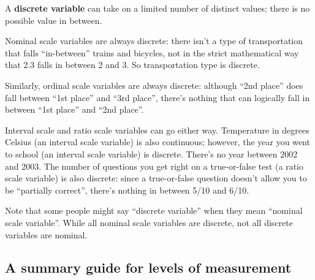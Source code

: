 \documentclass[
  11pt,
  a4paper,
  twoside,symmetric,openright]{book}
\theoremstyle{break}
\theoremstyle{break}
\begin{document}
\begin{definition}
\protect\hypertarget{def:defdiscrete}{}\label{def:defdiscrete}A \textbf{discrete variable} can take on a limited number of distinct values; there is no possible value in between.
\end{definition}

\begin{example}
\protect\hypertarget{exm:exdiscrete}{}\label{exm:exdiscrete}Nominal scale variables are always discrete: there isn't a type of transportation that falls ``in-between'' trains and bicycles, not in the strict mathematical way that 2.3 falls in between 2 and 3. So transportation type is discrete.

Similarly, ordinal scale variables are always discrete: although ``2nd place'' does fall between ``1st place'' and ``3rd place'', there's nothing that can logically fall in between ``1st place'' and ``2nd place''.

Interval scale and ratio scale variables can go either way. Temperature in degrees Celsius (an interval scale variable) is also continuous; however, the year you went to school (an interval scale variable) is discrete. There's no year between 2002 and 2003. The number of questions you get right on a true-or-false test (a ratio scale variable) is also discrete: since a true-or-false question doesn't allow you to be ``partially correct'', there's nothing in between 5/10 and 6/10.
\end{example}

Note that some people might say ``discrete variable'' when they mean ``nominal scale variable''. While all nominal scale variables are discrete, not all discrete variables are nominal.

\subsection{A summary guide for levels of measurement}\label{summaryguidelevels}
\end{document}
